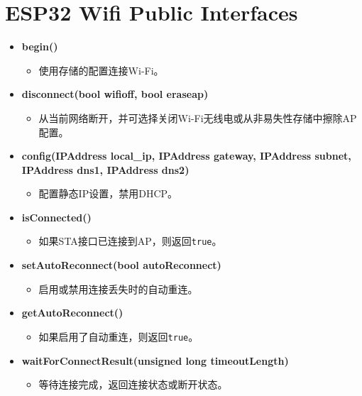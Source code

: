 \section{ESP32 Wifi Public Interfaces}

\begin{itemize}

    \item \textbf{begin()}
          \begin{itemize}
              \item 使用存储的配置连接Wi-Fi。
          \end{itemize}

    \item \textbf{disconnect(bool wifioff, bool eraseap)}
          \begin{itemize}
              \item 从当前网络断开，并可选择关闭Wi-Fi无线电或从非易失性存储中擦除AP配置。
          \end{itemize}

    \item \textbf{config(IPAddress local\_ip, IPAddress gateway, IPAddress subnet, IPAddress dns1, IPAddress dns2)}
          \begin{itemize}
              \item 配置静态IP设置，禁用DHCP。
          \end{itemize}

    \item \textbf{isConnected()}
          \begin{itemize}
              \item 如果STA接口已连接到AP，则返回\texttt{true}。
          \end{itemize}

    \item \textbf{setAutoReconnect(bool autoReconnect)}
          \begin{itemize}
              \item 启用或禁用连接丢失时的自动重连。
          \end{itemize}

    \item \textbf{getAutoReconnect()}
          \begin{itemize}
              \item 如果启用了自动重连，则返回\texttt{true}。
          \end{itemize}

    \item \textbf{waitForConnectResult(unsigned long timeoutLength)}
          \begin{itemize}
              \item 等待连接完成，返回连接状态或断开状态。
          \end{itemize}


\end{itemize}
